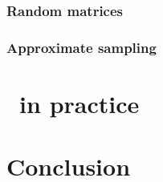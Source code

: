 \documentclass[twoside,11pt]{article}
\begin{document}

    \subsubsection{Random matrices} %
    \label{ssub:random_matrices}
    

    \subsubsection{Approximate sampling} %
    \label{ssub:approximate_sampling}
    



\section{\DPPy\ in practice} %
\label{sec:dppy_in_practice}

  



\section{Conclusion} %
\label{sec:conclusion}








\end{document}
